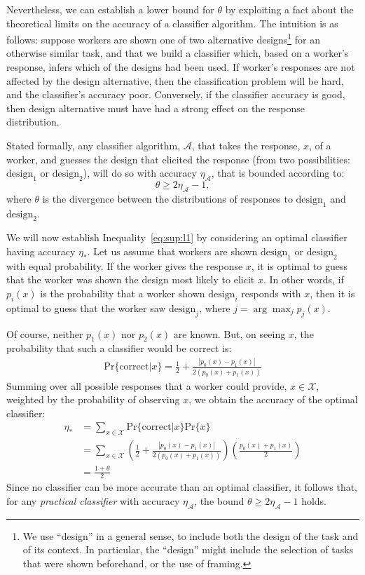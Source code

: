 \documentclass{sigchi}
\begin{document}
Nevertheless, we can establish a lower bound for $\theta$ by 
exploiting a fact about the theoretical limits on the accuracy of a 
classifier algorithm.  The intuition is as follows: 
suppose workers are shown one of two alternative designs\footnote{We
use ``design'' in a general sense, to include both the design of the task
and of its context.  In particular, the ``design'' might include the
selection of tasks that were shown beforehand, or the use of framing.}
for an otherwise
similar task, and that we build a classifier which, 
based on a worker's response, infers which of the designs had been 
used.
If worker's responses are not affected by the design alternative,
then the classification problem will be hard, and the classifier's 
accuracy poor.
Conversely, if the classifier accuracy is good, then design alternative 
must have had a strong effect on the response distribution.

Stated formally, any classifier algorithm, $\mathcal{A}$, that
takes the response, $x$, of a worker, and guesses the 
design that elicited the response (from two possibilities:
$\mathrm{design}_1$ or $\mathrm{design}_2$), will do so with accuracy 
$\eta_\mathcal{A}$, that is bounded according to:
\begin{equation}
	\theta \geq 2\eta_\mathcal{A} - 1,
	\label{eq:sup:l1}
\end{equation}
where $\theta$ is the divergence between the distributions of responses
to $\mathrm{design}_1$ and $\mathrm{design}_2$.

We will now establish Inequality~\ref{eq:sup:l1} by considering an
optimal classifier having accuracy $\eta_*$.  
Let us assume that workers are shown 
$\mathrm{design}_1$ or $\mathrm{design}_2$ with equal probability.
If the worker gives the response $x$, it is optimal to guess
that the worker was shown the design most likely to elicit $x$.
In other words, if $p_i(x)$ is the probability that a worker shown 
$\mathrm{design}_i$ responds with $x$, then it is optimal to 
guess that the worker saw $\mathrm{design}_j$, where 
$j = \arg\max_j{p_j(x)}$.

Of course, neither $p_1(x)$ nor $p_2(x)$ are known.  But, on seeing $x$,
the probability that such a classifier would be correct is:
\begin{align}
  \mathrm{Pr}\{\mathrm{correct}|x\} = \frac{1}{2} 
	+ \frac{|p_0(x) - p_1(x)|}{2(p_0(x) + p_1(x))}
\end{align}
Summing over all possible responses that a worker could provide, 
$x \in \mathcal{X}$, weighted by the probability of observing $x$, 
we obtain the accuracy of the optimal classifier:
\begin{align}
\eta_* 
  &= \sum_{x\in\mathcal{X}} 
	\mathrm{Pr}\{\mathrm{correct}|x\}\mathrm{Pr}\{x\} \\
  &= \sum_{x\in\mathcal{X}} 
	\left(
	\frac{1}{2} + \frac{|p_0(x) - p_1(x)|}{2(p_0(x) + p_1(x))}
  \right) \left( 
	\frac{p_0(x) + p_1(x)}{2} 
  \right) \\
  &= \frac{1 + \theta}{2}
\end{align}
Since no classifier can be more accurate than an optimal classifier,
it follows that, for any \textit{practical classifier} 
with accuracy $\eta_\mathcal{A}$, the bound 
$\theta \geq 2\eta_\mathcal{A} -1$ holds.
\end{document}
